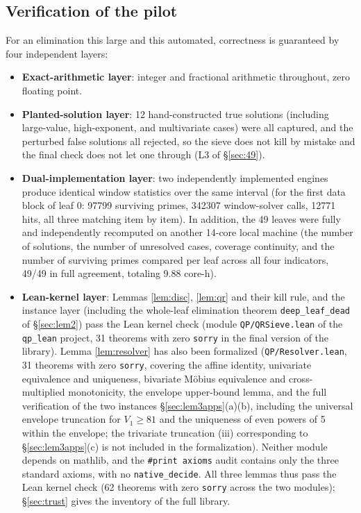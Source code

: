 \documentclass[11pt]{article}
\theoremstyle{remark}
\begin{document}
\subsection{Verification of the pilot}\label{sec:verif49}

For an elimination this large and this automated, correctness is guaranteed by four independent layers:

\begin{itemize}
\item \textbf{Exact-arithmetic layer}: integer and fractional arithmetic throughout, zero floating point.
\item \textbf{Planted-solution layer}: 12 hand-constructed true solutions (including large-value, high-exponent, and multivariate cases) were all captured, and the perturbed false solutions all rejected, so the sieve does not kill by mistake and the final check does not let one through (L3 of \S\ref{sec:49}).
\item \textbf{Dual-implementation layer}: two independently implemented engines produce identical window statistics over the same interval (for the first data block of leaf 0: 97799 surviving primes, 342307 window-solver calls, 12771 hits, all three matching item by item). In addition, the 49 leaves were fully and independently recomputed on another 14-core local machine (the number of solutions, the number of unresolved cases, coverage continuity, and the number of surviving primes compared per leaf across all four indicators, 49/49 in full agreement, totaling 9.88 core-h).
\item \textbf{Lean-kernel layer}: Lemmas \ref{lem:disc}, \ref{lem:qr} and their kill rule, and the instance layer (including the whole-leaf elimination theorem \texttt{deep\_leaf\_dead} of \S\ref{sec:lem2}) pass the Lean kernel check (module \texttt{QP/QRSieve.lean} of the \texttt{qp\_lean} project, 31 theorems with zero \texttt{sorry} in the final version of the library). Lemma \ref{lem:resolver} has also been formalized (\texttt{QP/Resolver.lean}, 31 theorems with zero \texttt{sorry}, covering the affine identity, univariate equivalence and uniqueness, bivariate M\"obius equivalence and cross-multiplied monotonicity, the envelope upper-bound lemma, and the full verification of the two instances \S\ref{sec:lem3apps}(a)(b), including the universal envelope truncation for $V_1 \ge 81$ and the uniqueness of even powers of 5 within the envelope; the trivariate truncation (iii) corresponding to \S\ref{sec:lem3apps}(c) is not included in the formalization). Neither module depends on mathlib, and the \texttt{\#print axioms} audit contains only the three standard axioms, with no \texttt{native\_decide}. All three lemmas thus pass the Lean kernel check (62 theorems with zero \texttt{sorry} across the two modules); \S\ref{sec:trust} gives the inventory of the full library.
\end{itemize}
\end{document}
